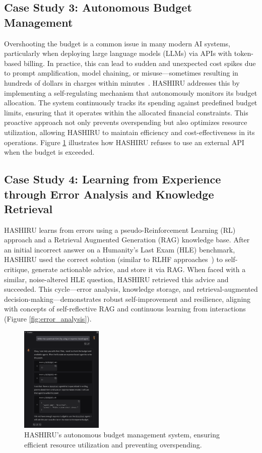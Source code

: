 \documentclass[conference]{IEEEtran}
\begin{document}
\subsection{Case Study 3: Autonomous Budget Management}
\label{sec:casestudy3_budget}
Overshooting the budget is a common issue in many modern AI systems, particularly when deploying large language models (LLMs) via APIs with token-based billing.
In practice, this can lead to sudden and unexpected cost spikes due to prompt amplification, model chaining, or misuse—sometimes resulting in hundreds of dollars in charges within minutes~\cite{gemini_reddit,openai_sos,openai_costs}.
HASHIRU addresses this by implementing a self-regulating mechanism that autonomously monitors its budget allocation.
The system continuously tracks its spending against predefined budget limits, ensuring that it operates within the allocated financial constraints.
This proactive approach not only prevents overspending but also optimizes resource utilization, allowing HASHIRU to maintain efficiency and cost-effectiveness in its operations.
Figure \ref{fig:budget_management} illustrates how HASHIRU refuses to use an external API when the budget is exceeded.

\subsection{Case Study 4: Learning from Experience through Error Analysis and Knowledge Retrieval}
\label{sec:casestudy4_experiential_learning}
HASHIRU learns from errors using a pseudo-Reinforcement Learning (RL) approach and a Retrieval Augmented Generation (RAG) knowledge base. After an initial incorrect answer on a Humanity's Last Exam (HLE) benchmark, HASHIRU used the correct solution (similar to RLHF approaches~\cite{ziegler2019fine,ouyang2022training}) to self-critique, generate actionable advice, and store it via RAG. When faced with a similar, noise-altered HLE question, HASHIRU retrieved this advice and succeeded. This cycle—error analysis, knowledge storage, and retrieval-augmented decision-making—demonstrates robust self-improvement and resilience, aligning with concepts of self-reflective RAG and continuous learning from interactions~\cite{asai2023self,shinn2023reflexion} (Figure \ref{fig:error_analysis}).

\begin{figure}[h]
    \centering
    \includegraphics[width=0.35\textwidth]{budget2.png}
    \caption{HASHIRU's autonomous budget management system, ensuring efficient resource utilization and preventing overspending.}
    \label{fig:budget_management}
\end{figure}
\end{document}
